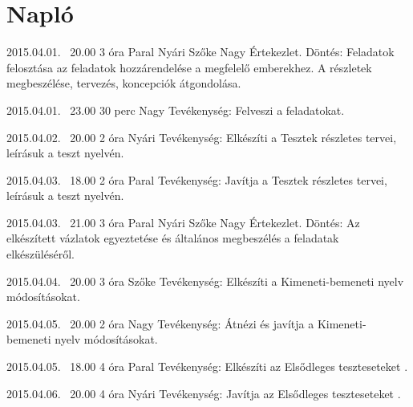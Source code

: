 %
\section{Napló}

\begin{naplo}
	
	\bejegyzes
	{2015.04.01. ~20.00}
	{3 óra}
	{Paral \newline Nyári \newline Szőke \newline Nagy} 
	{Értekezlet.
		Döntés: Feladatok felosztása az feladatok hozzárendelése a megfelelő emberekhez. A részletek megbeszélése, tervezés, koncepciók átgondolása.\newline } 

	\bejegyzes
	{2015.04.01. ~23.00}
	{30 perc}
	{Nagy} 
	{Tevékenység: Felveszi a feladatokat.\newline } 			
	
	\bejegyzes
	{2015.04.02. ~20.00}
	{2 óra}
	{Nyári} 
	{Tevékenység: Elkészíti a Tesztek részletes tervei, leírásuk a teszt nyelvén.\newline }
	
	\bejegyzes
	{2015.04.03. ~18.00}
	{2 óra}
	{Paral} 
	{Tevékenység: Javítja a Tesztek részletes tervei, leírásuk a teszt nyelvén.\newline }
	
  \bejegyzes
	{2015.04.03. ~21.00}
	{3 óra}
	{Paral \newline Nyári \newline Szőke \newline Nagy} 
	{Értekezlet.
		Döntés: Az elkészített vázlatok egyeztetése és általános megbeszélés a feladatak elkészüléséről.\newline } 

	\bejegyzes
	{2015.04.04. ~20.00}
	{3 óra}
	{Szőke} 
	{Tevékenység: Elkészíti a Kimeneti-bemeneti nyelv módosításokat.\newline }	

	\bejegyzes
	{2015.04.05. ~20.00}
	{2 óra}
	{Nagy} 
	{Tevékenység: Átnézi és javítja a Kimeneti-bemeneti nyelv módosításokat.\newline }	

    \bejegyzes
    {2015.04.05. ~18.00}
    {4 óra}
    {Paral} 
    {Tevékenység: Elkészíti az Elsődleges teszteseteket .\newline } 
 
    \bejegyzes
    {2015.04.06. ~20.00}
    {4 óra}
    {Nyári} 
    {Tevékenység: Javítja az Elsődleges teszteseteket .\newline } 
       

\end{naplo}
